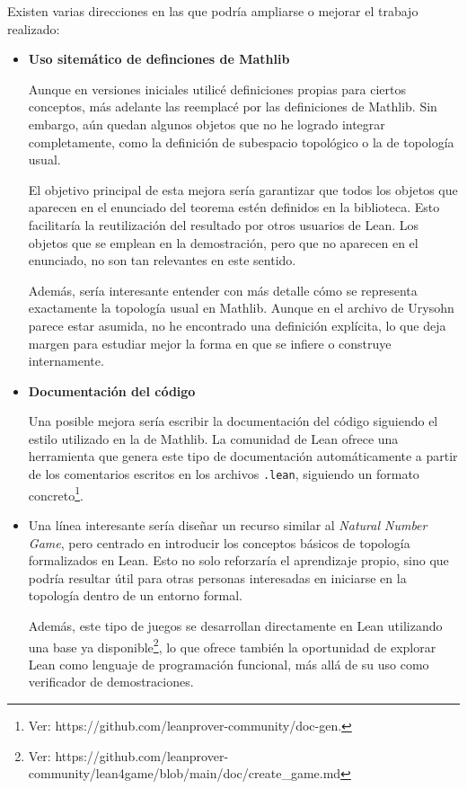 Existen varias direcciones en las que podría ampliarse o mejorar el trabajo realizado:

\begin{itemize}
  \item \textbf{Uso sitemático de definciones de Mathlib}
  
  Aunque en versiones iniciales utilicé definiciones propias para ciertos conceptos, más adelante las reemplacé por las definiciones de Mathlib. Sin embargo, aún quedan algunos objetos que no he logrado integrar completamente, como la definición de subespacio topológico o la de topología usual.

  El objetivo principal de esta mejora sería garantizar que todos los objetos que aparecen en el enunciado del teorema estén definidos en la biblioteca. Esto facilitaría la reutilización del resultado por otros usuarios de Lean. Los objetos que se emplean en la demostración, pero que no aparecen en el enunciado, no son tan relevantes en este sentido.

  Además, sería interesante entender con más detalle cómo se representa exactamente la topología usual en Mathlib. Aunque en el archivo de Urysohn parece estar asumida, no he encontrado una definición explícita, lo que deja margen para estudiar mejor la forma en que se infiere o construye internamente.

  \item \textbf{Documentación del código}
  
  Una posible mejora sería escribir la documentación del código siguiendo el estilo utilizado en la de Mathlib. La comunidad de Lean ofrece una herramienta que genera este tipo de documentación automáticamente a partir de los comentarios escritos en los archivos \texttt{.lean}, siguiendo un formato concreto\footnote{Ver: https://github.com/leanprover-community/doc-gen.}.

  \item Una línea interesante sería diseñar un recurso similar al \textit{Natural Number Game}, pero centrado en introducir los conceptos básicos de topología formalizados en Lean. Esto no solo reforzaría el aprendizaje propio, sino que podría resultar útil para otras personas interesadas en iniciarse en la topología dentro de un entorno formal.
  
  Además, este tipo de juegos se desarrollan directamente en Lean utilizando una base ya disponible\footnote{Ver: \linebreak https://github.com/leanprover-community/lean4game/blob/main/doc/create\_game.md}, lo que ofrece también la oportunidad de explorar Lean como lenguaje de programación funcional, más allá de su uso como verificador de demostraciones.
\end{itemize}